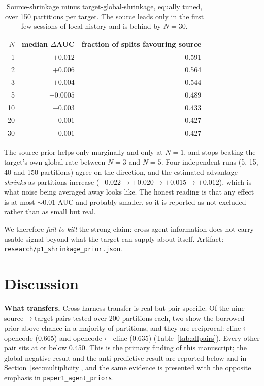 \documentclass[11pt]{article}
\begin{document}
\begin{table}[t]
\centering
\caption{Source-shrinkage minus target-global-shrinkage, equally tuned, over
150 partitions per target. The source leads only in the first few sessions of
local history and is behind by $N=30$.}
\label{tab:shrinkage}
\small
\begin{tabular}{rrr}
\toprule
$N$ & median $\Delta$AUC & fraction of splits favouring source \\
\midrule
 1 & $+0.012$ & 0.591 \\
 2 & $+0.006$ & 0.564 \\
 3 & $+0.004$ & 0.544 \\
 5 & $-0.0005$ & 0.489 \\
10 & $-0.003$ & 0.433 \\
20 & $-0.001$ & 0.427 \\
30 & $-0.001$ & 0.427 \\
\bottomrule
\end{tabular}
\end{table}

The source prior helps only marginally and only at $N=1$, and stops beating the
target's own global rate between $N=3$ and $N=5$. Four independent runs (5, 15,
40 and 150 partitions) agree on the direction, and the estimated advantage
\emph{shrinks} as partitions increase ($+0.022 \to +0.020 \to +0.015 \to
+0.012$), which is what noise being averaged away looks like. The honest reading
is that any effect is at most $\sim 0.01$ AUC and probably smaller, so it is
reported as not excluded rather than as small but real.

We therefore \emph{fail to kill} the strong claim: cross-agent information does
not carry usable signal beyond what the target can supply about itself. Artifact:
\texttt{research/p1\_shrinkage\_prior.json}.

\section{Discussion}

\textbf{What transfers.} Cross-harness transfer is real but pair-specific.
Of the nine source$\to$target pairs tested over 200 partitions each, two show
the borrowed prior above chance in a majority of partitions, and they are
reciprocal: cline$\leftarrow$opencode (0.665) and opencode$\leftarrow$cline
(0.635) (Table~\ref{tab:allpairs}). Every other pair sits at or below 0.450.
This is the primary finding of this manuscript; the global negative result and
the anti-predictive result are reported below and in
Section~\ref{sec:multiplicity}, and the same evidence is presented with the
opposite emphasis in \texttt{paper1\_agent\_priors}.
\end{document}
